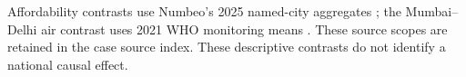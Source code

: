 

\CountryInterpretation
Affordability contrasts use Numbeo's 2025 named-city aggregates
\cite{numbeocase}; the Mumbai--Delhi air contrast uses 2021 WHO monitoring
means \cite{whocase}. These source scopes are retained in the case source index.
These descriptive contrasts do not identify a national causal effect.

\FloatBarrier
